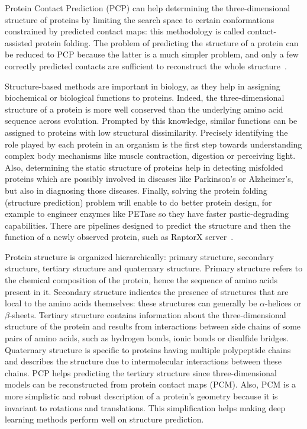     Protein Contact Prediction (PCP) can help determining the three-dimensional structure of proteins by limiting the search space to certain conformations
    constrained by predicted contact maps: this methodology is called contact-assisted protein folding.
    The problem of predicting the structure of a protein can be reduced to PCP because the latter is a much simpler problem,
    and only a few correctly predicted contacts are sufficient to reconstruct the whole structure~\cite{kim2014one}.

    Structure-based methods are important in biology, as they help in assigning biochemical or biological functions to proteins. Indeed, the three-dimensional
    structure of a protein is more well conserved than the underlying amino acid sequence across evolution. Prompted by this knowledge, similar functions
    can be assigned to proteins with low structural dissimilarity. Precisely identifying the role played by each protein in an organism is the first step
    towards understanding complex body mechanisms like muscle contraction, digestion or perceiving light.
    Also, determining the static structure of proteins help in detecting misfolded proteins which are possibly involved in diseases like Parkinson's or
    Alzheimer's, but also in diagnosing those diseases.
    Finally, solving the protein folding (structure prediction) problem will enable to do better protein design, for example to engineer enzymes like PETase
    so they have faster pastic-degrading capabilities.
    There are pipelines designed to predict the structure and then the function of a newly
    observed protein, such as RaptorX server~\cite{peng2011raptorx}.

    Protein structure is organized hierarchically: primary structure, secondary structure, tertiary structure
    and quaternary structure. Primary structure refers to the chemical composition of the protein, hence the sequence of amino acids present in it.
    Secondary structure indicates the presence of structures that are local to the amino acids themselves: these structures can generally be $\alpha$-helices
    or $\beta$-sheets. Tertiary structure contains information about the three-dimensional structure of the protein and results from interactions
    between side chains of some pairs of amino acids, such as hydrogen bonds, ionic bonds or disulfide bridges.
    Quaternary structure is specific to proteins having multiple polypeptide chains and describes the structure due to intermolecular interactions between
    these chains. PCP helps predicting the tertiary structure since three-dimensional models can be reconstructed from protein contact maps (PCM).
    Also, PCM is a more simplistic and robust description of a protein's geometry because it is invariant to rotations and translations.
    This simplification helps making deep learning methods perform well on structure prediction.

